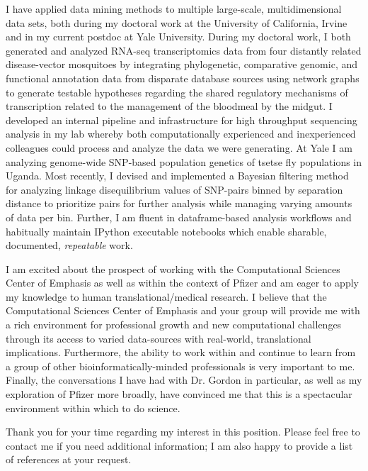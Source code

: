 \documentclass[11pt,letterpaper,sans]{moderncv}
\begin{document}
I have applied data mining methods to multiple large-scale, multidimensional data sets, both during my doctoral work at the University of California, Irvine and in my current postdoc at Yale University. 
During my doctoral work, I both generated and analyzed RNA-seq transcriptomics data from four distantly related disease-vector mosquitoes by integrating phylogenetic, comparative genomic, and functional annotation data from disparate database sources using network graphs to generate testable hypotheses regarding the shared regulatory mechanisms of transcription related to the management of the bloodmeal by the midgut.
I developed an internal pipeline and infrastructure for high throughput sequencing analysis in my lab whereby both computationally experienced and inexperienced colleagues could process and analyze the data we were generating. 
At Yale I am analyzing genome-wide SNP-based population genetics of tsetse fly populations in Uganda.
Most recently, I devised and implemented a Bayesian filtering method for analyzing linkage disequilibrium values of SNP-pairs binned by separation distance to prioritize pairs for further analysis while managing varying amounts of data per bin.
Further, I am fluent in dataframe-based analysis workflows and habitually maintain IPython executable notebooks which enable sharable, documented, \emph{repeatable} work.



I am excited about the prospect of working with the Computational Sciences Center of Emphasis as well as within the context of Pfizer and am eager to apply my knowledge to human translational/medical research.
I believe that the Computational Sciences Center of Emphasis and your group will provide me with a rich environment for professional growth and new computational challenges through its access to varied data-sources with real-world, translational implications.
Furthermore, the ability to work within and continue to learn from a group of other bioinformatically-minded professionals is very important to me.
Finally, the conversations I have had with Dr. Gordon in particular, as well as my exploration of Pfizer more broadly, have convinced me that this is a spectacular environment within which to do science.

Thank you for your time regarding my interest in this position.
Please feel free to contact me if you need additional information; I am also happy to provide a list of references at your request.

\makeletterclosing

\end{document}
